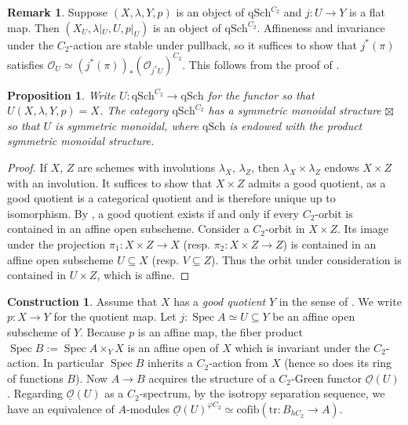 \documentclass{article}
\DeclareMathOperator{\Spec}{Spec}
\newtheorem{proposition}[equation]{Proposition}
\theoremstyle{definition}
\newtheorem{construction}[equation]{Construction}
\newtheorem{remark}[equation]{Remark}
\newcommand{\Lucy}[1]{\todo[color=cyan!30]{\linespread{1}\footnotesize L: #1}}
\begin{document}
\begin{remark}\label{remark:restriction_of_schemes_with_involution}
    Suppose $ (X,\lambda, Y, p) $ is an object of $ \mathrm{qSch}^{C_2} $ and $ j \colon U \to Y $ is a flat map. %
    Then $ (X_U, \lambda|_U, U, p|_U) $ is an object of $ \mathrm{qSch}^{C_2} $. 
    Affineness and invariance under the $ C_2 $-action are stable under pullback, so it suffices to show that $ j^*(\pi) $ satisfies $ \mathcal{O}_U \simeq \left(j^*(\pi)\right)_*(\mathcal{O}_{j^*U})^{C_2} $. 
    This follows from the proof of \cite[Theorem 4.35(i)]{azumaya_involution}.  
\end{remark}
\begin{proposition}
    Write $ U \colon \mathrm{qSch}^{C_2} \to \mathrm{qSch} $ for the functor so that $ U(X, \lambda, Y, p) = X $.  
    The category $ \mathrm{qSch}^{C_2} $ has a symmetric monoidal structure $ \boxtimes $ so that $ U $ is symmetric monoidal, where $ \mathrm{qSch} $ is endowed with the product symmetric monoidal structure. 
\end{proposition}
\begin{proof}
    If $ X $, $ Z $ are schemes with involutions $ \lambda_X $, $ \lambda_Z $, then $ \lambda_X \times \lambda_Z $ endows $ X \times Z $ with an involution. 
    It suffices to show that $ X \times Z $ admits a good quotient, as a good quotient is a categorical quotient and is therefore unique up to isomorphism. 
    By \cite[Remark 4.20]{azumaya_involution}, a good quotient exists if and only if every $ C_2 $-orbit is contained in an affine open subscheme. 
    Consider a $ C_2 $-orbit in $ X \times Z $. 
    Its image under the projection $ \pi_1 \colon X \times Z \to X $ (resp. $ \pi_2 \colon X \times Z \to Z $) is contained in an affine open subscheme $ U \subseteq X $ (resp. $ V \subseteq Z $). 
    Thus the orbit under consideration is contained in $ U \times Z $, which is affine. 
\end{proof}
\begin{construction}\label{cons:structure_sheaf_of_Green_functors}
    Assume that $ X $ has a \emph{good quotient} $ Y $ in the sense of \cite[Remark 4.20]{azumaya_involution}. 
    We write $ p \colon X \to Y $ for the quotient map.
    Let $ j \colon \Spec A  \simeq U \subseteq Y $ be an affine open subscheme of $ Y $. 
    Because $ p $ is an affine map, the fiber product $ \Spec B := \Spec A \times_{Y} X $ is an affine open of $ X $ which is invariant under the $ C_2 $-action. 
    In particular $ \Spec B $ inherits a $ C_2 $-action from $ X $ (hence so does its ring of functions $ B$).  
    Now $ A \to B $ acquires the structure of a $C_2$-Green functor $ \underline{\mathcal{O}}(U) $. 
    Regarding $ \underline{\mathcal{O}}(U) $ as a $ C_2 $-spectrum, by the isotropy separation sequence, we have an equivalence of $ A $-modules $ \underline{\mathcal{O}}(U)^{\varphi C_2} \simeq \mathrm{cofib} (\mathrm{tr} \colon B_{hC_2} \to A) $. 
\end{construction}
\end{document}
